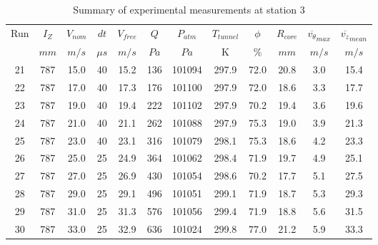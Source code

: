 \begin{table}[H]
\begin{center}
\begin{tabular}{|cccccccccccc|}
	\hline
	Run & $I_Z$ & $V_{nom}$ & $dt$ & $V_{free}$ & $Q$ & $P_{atm}$ & $T_{tunnel}$ & $\phi$ & $R_{core}$ & $\overline{v_{\theta}}_{max}$ & $\overline{v_{z}}_{mean}$\\
	  & $mm$ & $m/s$ & $\mu s$ & $m/s$ & $Pa$ & $Pa$ & K & $\%$ & $mm$ & $m/s$ & $m/s$\\
	\hline
	21 & 787 & 15.0 & 40 & 15.2 & 136 & 101094 & 297.9 & 72.0 & 20.8 & 3.0 & 15.4\\
	22 & 787 & 17.0 & 40 & 17.3 & 176 & 101100 & 297.9 & 72.0 & 18.6 & 3.3 & 17.7\\
	23 & 787 & 19.0 & 40 & 19.4 & 222 & 101102 & 297.9 & 70.2 & 19.4 & 3.6 & 19.6\\
	24 & 787 & 21.0 & 40 & 21.1 & 262 & 101088 & 297.9 & 75.3 & 19.0 & 3.9 & 21.3\\
	25 & 787 & 23.0 & 40 & 23.1 & 316 & 101079 & 298.1 & 75.3 & 18.6 & 4.2 & 23.3\\
	26 & 787 & 25.0 & 25 & 24.9 & 364 & 101062 & 298.4 & 71.9 & 19.7 & 4.9 & 25.1\\
	27 & 787 & 27.0 & 25 & 26.9 & 430 & 101054 & 298.6 & 70.2 & 17.7 & 5.1 & 27.5\\
	28 & 787 & 29.0 & 25 & 29.1 & 496 & 101051 & 299.1 & 71.9 & 18.7 & 5.3 & 29.3\\
	29 & 787 & 31.0 & 25 & 31.3 & 576 & 101056 & 299.4 & 71.9 & 18.8 & 5.6 & 31.5\\
	30 & 787 & 33.0 & 25 & 32.9 & 636 & 101024 & 299.8 & 77.0 & 21.2 & 5.9 & 33.3\\
	\hline
\end{tabular}
\caption{Summary of experimental measurements at station 3}
\label{table:experiment_results_3}
\end{center}
\end{table}
